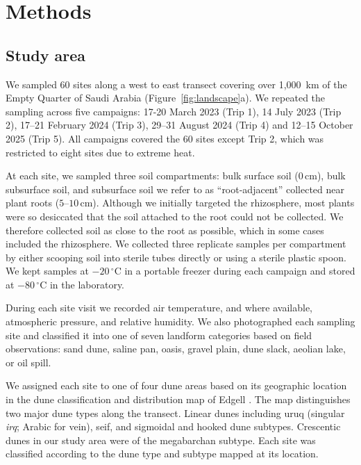 \documentclass[fleqn,10pt,numbers]{olplainarticle}
\begin{document}
\section*{Methods}\label{sec11}

\subsection*{Study area}

We sampled 60 sites along a west to east transect covering over 1,000~km of the Empty Quarter of Saudi Arabia (Figure~\ref{fig:landscape}a). We repeated the sampling across five campaigns: 17-20 March 2023 (Trip 1), 14 July 2023 (Trip 2), 17–21 February 2024 (Trip 3), 29–31 August 2024 (Trip 4) and 12–15 October 2025 (Trip 5). All campaigns covered the 60 sites except Trip 2, which was restricted to eight sites due to extreme heat.

At each site, we sampled three soil compartments: bulk surface soil ($0\,\mathrm{cm}$), bulk subsurface soil, and subsurface soil we refer to as ``root-adjacent'' collected near plant roots ($5$--$10\,\mathrm{cm}$). Although we initially targeted the rhizosphere, most plants were so desiccated that the soil attached to the root could not be collected. We therefore collected soil as close to the root as possible, which in some cases included the rhizosphere. We collected three replicate samples per compartment by either scooping soil into sterile tubes directly or using a sterile plastic spoon. We kept samples at $-20\,^{\circ}\mathrm{C}$ in a portable freezer during each campaign and stored at $-80\,^{\circ}\mathrm{C}$ in the laboratory.

During each site visit we recorded air temperature, and where available, atmospheric pressure, and relative humidity. We also photographed each sampling site and classified it into one of seven landform categories based on field observations: sand dune, saline pan, oasis, gravel plain, dune slack, aeolian lake, or oil spill.

We assigned each site to one of four dune areas based on its geographic location in the dune classification and distribution map of Edgell \cite{edgell2006arabian}. The map distinguishes two major dune types along the transect. Linear dunes including uruq (singular \emph{irq}; Arabic for vein), seif, and sigmoidal and hooked dune subtypes. Crescentic dunes in our study area were of the megabarchan subtype. Each site was classified according to the dune type and subtype mapped at its location.
\end{document}
